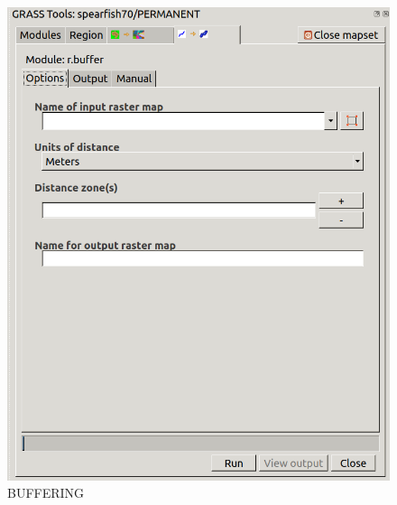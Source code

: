 \begin{figure}[htbp]
   \centering
   \includegraphics[scale=0.2]{grass015.png}
   \caption{BUFFERING}
   \label{fig:grass015}
\end{figure}

